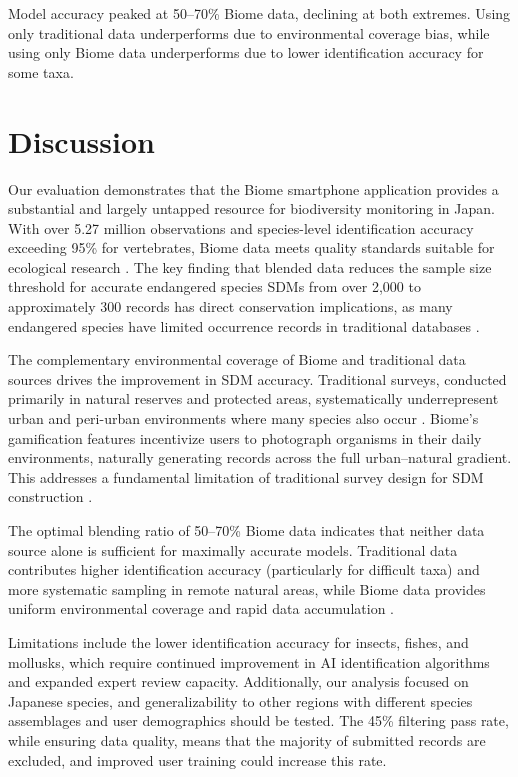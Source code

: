 \documentclass[11pt]{article}
\begin{document}
Model accuracy peaked at 50--70\% Biome data, declining at both extremes. Using only traditional data underperforms due to environmental coverage bias, while using only Biome data underperforms due to lower identification accuracy for some taxa.

\section{Discussion}

Our evaluation demonstrates that the Biome smartphone application provides a substantial and largely untapped resource for biodiversity monitoring in Japan. With over 5.27 million observations and species-level identification accuracy exceeding 95\% for vertebrates, Biome data meets quality standards suitable for ecological research \citep{kosmala2016assessing}. The key finding that blended data reduces the sample size threshold for accurate endangered species SDMs from over 2,000 to approximately 300 records has direct conservation implications, as many endangered species have limited occurrence records in traditional databases \citep{callaghan2019improving}.

The complementary environmental coverage of Biome and traditional data sources drives the improvement in SDM accuracy. Traditional surveys, conducted primarily in natural reserves and protected areas, systematically underrepresent urban and peri-urban environments where many species also occur \citep{beck2014spatial}. Biome's gamification features incentivize users to photograph organisms in their daily environments, naturally generating records across the full urban--natural gradient. This addresses a fundamental limitation of traditional survey design for SDM construction \citep{geldmann2016determines}.

The optimal blending ratio of 50--70\% Biome data indicates that neither data source alone is sufficient for maximally accurate models. Traditional data contributes higher identification accuracy (particularly for difficult taxa) and more systematic sampling in remote natural areas, while Biome data provides uniform environmental coverage and rapid data accumulation \citep{pocock2018vision}.

Limitations include the lower identification accuracy for insects, fishes, and mollusks, which require continued improvement in AI identification algorithms and expanded expert review capacity. Additionally, our analysis focused on Japanese species, and generalizability to other regions with different species assemblages and user demographics should be tested. The 45\% filtering pass rate, while ensuring data quality, means that the majority of submitted records are excluded, and improved user training could increase this rate.
\end{document}
